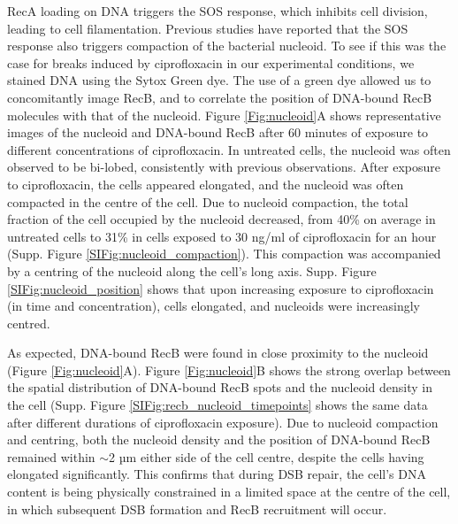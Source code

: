 RecA loading on DNA triggers the SOS response, which inhibits cell division, leading to cell filamentation. Previous studies have reported that the SOS response also triggers compaction of the bacterial nucleoid\cite{Odsbu2014}. To see if this was the case for breaks induced by ciprofloxacin in our experimental conditions, we stained DNA using the Sytox Green dye. The use of a green dye allowed us to concomitantly image RecB, and to correlate the position of DNA-bound RecB molecules with that of the nucleoid. Figure \ref{Fig:nucleoid}A shows representative images of the nucleoid and DNA-bound RecB after 60 minutes of exposure to different concentrations of ciprofloxacin. In untreated cells, the nucleoid was often observed to be bi-lobed, consistently with previous observations\cite{Lepore2023}. After exposure to ciprofloxacin, the cells appeared elongated, and the nucleoid was often compacted in the centre of the cell. Due to nucleoid compaction, the total fraction of the cell occupied by the nucleoid decreased, from 40\% on average in untreated cells to 31\% in cells exposed to 30 ng/ml of ciprofloxacin for an hour (Supp. Figure \ref{SIFig:nucleoid_compaction}). This compaction was accompanied by a centring of the nucleoid along the cell's long axis. Supp. Figure \ref{SIFig:nucleoid_position} shows that upon increasing exposure to ciprofloxacin (in time and concentration), cells elongated, and nucleoids were increasingly centred.

As expected, DNA-bound RecB were found in close proximity to the nucleoid (Figure \ref{Fig:nucleoid}A). Figure \ref{Fig:nucleoid}B shows the strong overlap between the spatial distribution of DNA-bound RecB spots and the nucleoid density in the cell (Supp. Figure \ref{SIFig:recb_nucleoid_timepoints} shows the same data after different durations of ciprofloxacin exposure). Due to nucleoid compaction and centring, both the nucleoid density and the position of DNA-bound RecB remained within $\sim$2 µm either side of the cell centre, despite the cells having elongated significantly. This confirms that during DSB repair, the cell's DNA content is being physically constrained in a limited space at the centre of the cell, in which subsequent DSB formation and RecB recruitment will occur.

